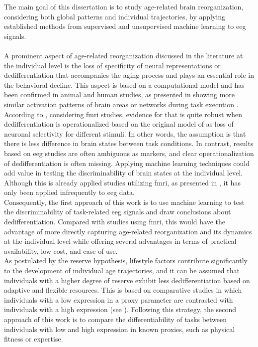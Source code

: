 The main goal of this dissertation is to study age-related brain reorganization, considering both global patterns and individual trajectories, by applying established methods from supervised and unsupervised machine learning to \gls{eeg} signals.\\
\\
A prominent aspect of age-related reorganization discussed in the literature at the individual level is the loss of specificity of neural representations or dedifferentiation that accompanies the aging process and plays an essential role in the behavioral decline. This aspect is based on a computational model and has been confirmed in animal and human studies, as presented in  showing more similar activation patterns of brain areas or networks during task execution \cite{Carb2011, Rieck2021, Antonenko2013, Geerligs2014}. According to \citeauthor{Koen2019}, considering \gls{fmri} studies, evidence for that is quite robust when dedifferentiation is operationalized based on the original model of \citeauthor{Li2001} \cite{Li2001,Li2002} as loss of neuronal selectivity for different stimuli. In other words, the assumption is that there is less difference in brain states between task conditions. In contrast, results based on \gls{eeg} studies are often ambiguous as markers, and clear operationalization of dedifferentiation is often missing. Applying machine learning techniques could add value in testing the discriminability of brain states at the individual level. Although this is already applied studies utilizing \gls{fmri}, as presented in , it has only been applied infrequently to \gls{eeg} data.\\
Consequently, the first approach of this work is to use machine learning to test the discriminability of task-related \gls{eeg} signals and draw conclusions about dedifferentiation. Compared with studies using \gls{fmri}, this would have the advantage of more directly capturing age-related reorganization and its dynamics at the individual level while offering several advantages in terms of practical availability, low cost, and ease of use.\\
As postulated by the reserve hypothesis, lifestyle factors contribute significantly to the development of individual age trajectories, and it can be assumed that individuals with a higher degree of reserve exhibit less dedifferentiation based on adaptive and flexible resources. This is based on comparative studies in which individuals with a low expression in a proxy parameter are contrasted with individuals with a high expression (see ). Following this strategy, the second approach of this work is to compare the differentiability of tasks between individuals with low and high expression in known proxies, such as physical fitness or expertise.\\
